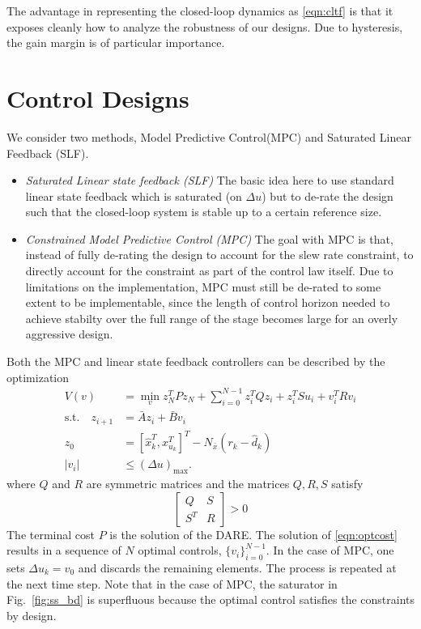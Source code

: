 \documentclass[journal,twocolumn,twoside]{IEEEtran}
\newcommand{\Ad}{\ensuremath{\bar A }\xspace}
\newcommand{\Bd}{\ensuremath{\bar B }\xspace}
\begin{document}
The advantage in representing the closed-loop dynamics as \eqref{eqn:cltf} is that it exposes cleanly how to analyze the robustness of our designs. Due to hysteresis, the gain margin is of particular importance. 


%   


\section{Control Designs}
We consider two methods, Model Predictive Control(MPC) and Saturated Linear Feedback (SLF).
\begin{itemize}
\item\emph{Saturated Linear state feedback (SLF)} The basic idea here to use standard linear state feedback which is saturated (on $\Delta u$) but to de-rate the design such that the closed-loop system is stable up to a certain reference size. 
\item\emph{Constrained Model Predictive Control (MPC)} The goal with MPC is that, instead of fully de-rating the design to account for the slew rate constraint, to directly account for the constraint as part of the control law itself. Due to limitations on the implementation, MPC must still be de-rated to some extent to be implementable, since the length of control horizon needed to achieve stabilty over the full range of the stage becomes large for an overly aggressive design.
\end{itemize}

Both the MPC and linear state feedback controllers can be described by the optimization
\begin{align}
V(v) &= \min_{v} z^T_{N}Pz_{N} + \sum_{i=0}^{N-1}z_{i}^{T}Qz_{i} + z^T_iSu_i + v^{T}_{i}Rv_{i} \label{eqn:optcost}\\
 \text{s.t.} \quad z_{i+1} &= \Ad z_{i} + \Bd v_{i}\\
z_{0} &= [\hat{x}^T_{k}, x^T_{u_k}]^T - N_{\bar{x}}(r_k-\hat{d}_k)\\
|v_i | & \leq (\Delta u)_{\text{max}}.\label{eqn:cntrl_constraint}
\end{align}
where $Q$ and $R$ are symmetric matrices and the matrices $Q,R,S$ satisfy
\begin{equation}
  \begin{bmatrix}
    Q & S\\S^T &R
  \end{bmatrix} > 0
\end{equation}
The terminal cost $P$ is the solution of the DARE. The solution of \eqref{eqn:optcost} results in a sequence of $N$ optimal controls, $\{v_i\}_{i=0}^{N-1}$. In the case of MPC, one sets $\Delta u_k = v_0$ and discards the remaining elements. The process is repeated at the next time step. Note that in the case of MPC, the saturator in Fig.~\ref{fig:ss_bd} is superfluous because the optimal control satisfies the constraints by design.
\end{document}
